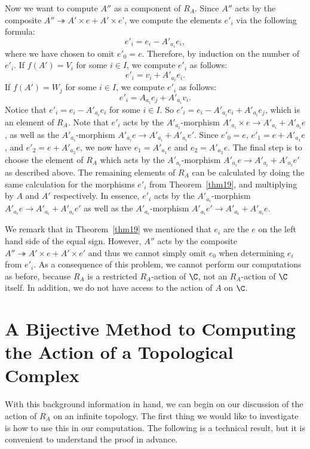 \documentclass[a4paper,reqno,oneside]{article}
\begin{document}
Now we want to compute $A''$ as a component of $R_A$.  Since $A''$ acts by the composite $A'' \twoheadrightarrow A' \times e + A' \times e$', we compute the elements $e'_i$ via the following formula:
$$
e'_i = e_i - A'_{a_i}e_i,
$$
where we have chosen to omit $e'_0 = e$.  Therefore, by induction on the number of $e'_i$.  If $f(A') = V_i$ for some $i \in I$, we compute $e'_i$ as follows:
\begin{equation}
    \label{eq:pullback1}
    e'_i = v_i + A'_{a_i}e_i.
\end{equation}
If $f(A') = W_j$ for some $i \in I$, we compute $e'_i$ as follows:
\begin{equation}
    \label{eq:pullback2}
    e'_i = A_{a_i}e_j + A'_{a_i}v_i.
\end{equation}
Notice that $e'_i = e_i - A'_{a_i}e_i$ for some $i \in I$.  So $e'_i = e_i - A'_{a_i}e_i + A'_{a_i}e_j$, which is an element of $R_A$.  Note that $e'_i$ acts by the $A'_{a_i}$-morphism $A'_{a_i} \times e \to A'_{a_i} + A'_{a_i}e$, as well as the $A'_{a_i}$-morphism $A'_{a_i}e \to A'_{a_i} + A'_{a_i}e'$.  Since $e'_0 = e$, $e'_1 = e + A'_{a_1}e$, and $e'_2 = e + A'_{a_2}e$, we now have $e_1 = A'_{a_1}e$ and $e_2 = A'_{a_2}e$.  The final step is to choose the element of $R_A$ which acts by the $A'_{a_i}$-morphism $A'_{a_i}e \to A'_{a_i} + A'_{a_i}e'$ as described above.  The remaining elements of $R_A$ can be calculated by doing the same calculation for the morphisms $e'_i$ from Theorem~\ref{thm19}, and multiplying by $A$ and $A'$ respectively.  In essence, $e'_i$ acts by the $A'_{a_i}$-morphism $A'_{a_i}e \to A'_{a_i} + A'_{a_i}e'$ as well as the $A'_{a_i}$-morphism $A'_{a_i}e' \to A'_{a_i} + A'_{a_i}e$.  

We remark that in Theorem~\ref{thm19} we mentioned that $e_i$ are the $e$ on the left hand side of the equal sign.  However, $A''$ acts by the composite $A'' \twoheadrightarrow A' \times e + A' \times e'$ and thus we cannot simply omit $e_0$ when determining $e_i$ from $e'_i$.  As a consequence of this problem, we cannot perform our computations as before, because $R_A$ is a restricted $R_A$-action of $\C$, not an $R_A$-action of $\C$ itself.  In addition, we do not have access to the action of $A$ on $\C$.

\section{A Bijective Method to Computing the Action of a Topological Complex}

With this background information in hand, we can begin on our discussion of the action of $R_A$ on an infinite topology.  The first thing we would like to investigate is how to use this in our computation.  The following is a technical result, but it is convenient to understand the proof in advance.
\end{document}
